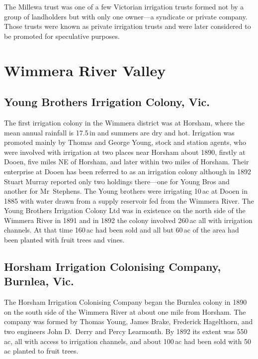 The Millewa trust was one of a few Victorian irrigation trusts formed
not by a group of landholders but with only one owner---a syndicate
or private company.  Those trusts were known as private irrigation
trusts and were later considered to be promoted for speculative
purposes.

\section*{Wimmera River Valley}

\subsection*{Young Brothers Irrigation Colony, Vic.}

The first irrigation colony in the Wimmera district was at Horsham,
where the mean annual rainfall is 17.5\,in and summers are dry and
hot.  Irrigation was promoted mainly by Thomas and George Young, stock
and station agents, who were involved with irrigation at two places
near Horsham about 1890, firstly at Dooen, five miles NE of Horsham,
and later within two miles of Horsham.  Their enterprise at Dooen has
been referred to as an irrigation colony although in 1892 Stuart
Murray reported only two holdings there---one for Young Bros and
another for Mr~Stephens.  The Young brothers were irrigating 10\,ac at
Dooen in 1885 with water drawn from a supply reservoir fed from the
Wimmera River.  The Young Brothers Irrigation Colony Ltd was in
existence on the north side of the Wimmera River in 1891 and in 1892
the colony involved 260\,ac all with irrigation channels.  At that
time 160\,ac had been sold and all but 60\,ac of the area had been
planted with fruit trees and vines.

\subsection*{Horsham Irrigation Colonising Company, Burnlea, Vic.}

The Horsham Irrigation Colonising Company began the Burnlea colony in
1890 on the south side of the Wimmera River at about one mile from
Horsham.  The company was formed by Thomas Young, James Brake,
Frederick Hagelthorn, and two engineers John D.~Derry and Percy
Learmonth.  By 1892 its extent was 550\,ac, all with access to
irrigation channels, and about 100\,ac had been sold with 50\,ac
planted to fruit trees.

